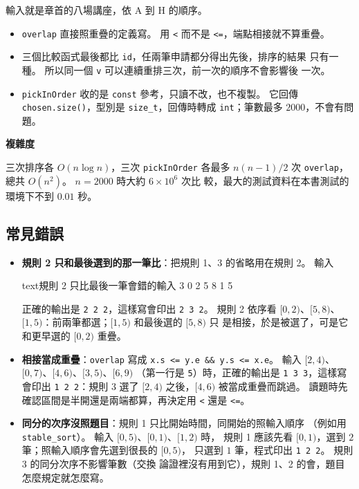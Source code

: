 輸入就是章首的八場講座，依 A 到 H 的順序。

\begin{itemize}
\item \texttt{overlap} 直接照重疊的定義寫。 用 \texttt{<} 而不是
\texttt{<=}，端點相接就不算重疊。
\item 三個比較函式最後都比 \texttt{id}，任兩筆申請都分得出先後，排序的結果
只有一種。 所以同一個 \texttt{v} 可以連續重排三次，前一次的順序不會影響後
一次。
\item \texttt{pickInOrder} 收的是 \texttt{const} 參考，只讀不改，也不複製。
它回傳 \texttt{chosen.size()}，型別是 \texttt{size\_t}，回傳時轉成
\texttt{int}；筆數最多 $2000$，不會有問題。
\end{itemize}

\textbf{複雜度}

三次排序各 $O(n \log n)$，三次 \texttt{pickInOrder} 各最多 $n(n-1)/2$ 次
\texttt{overlap}，總共 $O(n^2)$。 $n = 2000$ 時大約 $6 \times 10^6$ 次比
較，最大的測試資料在本書測試的環境下不到 $0.01$ 秒。

\subsection{常見錯誤}

\begin{itemize}
\item \textbf{規則 2 只和最後選到的那一筆比}：把規則 1、3 的省略用在規則 2。
輸入
\begin{code}{text}{規則 2 只比最後一筆會錯的輸入}
3
0 2
5 8
1 5
\end{code}
正確的輸出是 \texttt{2 2 2}，這樣寫會印出 \texttt{2 3 2}。 規則 2 依序看
$[0, 2)$、$[5, 8)$、$[1, 5)$：前兩筆都選；$[1, 5)$ 和最後選的 $[5, 8)$ 只
是相接，於是被選了，可是它和更早選的 $[0, 2)$ 重疊。
\item \textbf{相接當成重疊}：\texttt{overlap} 寫成 \texttt{x.s <= y.e \&\&
y.s <= x.e}。 輸入 $[2, 4)$、$[0, 7)$、$[4, 6)$、$[3, 5)$、$[6, 9)$
（第一行是 \texttt{5}）時，正確的輸出是 \texttt{1 3 3}，這樣寫會印出
\texttt{1 2 2}：規則 3 選了 $[2, 4)$ 之後，$[4, 6)$ 被當成重疊而跳過。
讀題時先確認區間是半開還是兩端都算，再決定用 \texttt{<} 還是 \texttt{<=}。
\item \textbf{同分的次序沒照題目}：規則 1 只比開始時間，同開始的照輸入順序
（例如用 \texttt{stable\_sort}）。 輸入 $[0, 5)$、$[0, 1)$、$[1, 2)$ 時，
規則 1 應該先看 $[0, 1)$，選到 $2$ 筆；照輸入順序會先選到很長的 $[0, 5)$，
只選到 $1$ 筆，程式印出 \texttt{1 2 2}。 規則 3 的同分次序不影響筆數（交換
論證裡沒有用到它），規則 1、2 的會，題目怎麼規定就怎麼寫。
\end{itemize}


